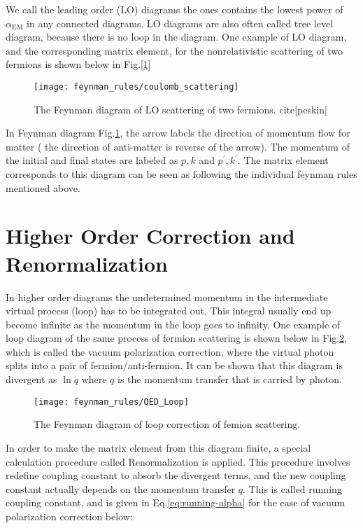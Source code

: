 We call the leading order (LO) diagrams the ones contains the lowest power of $\alpha_{\mathrm{EM}}$ in any connected diagrams. LO diagrams are also often called tree level diagram, because there is no loop in the diagram. One example of LO diagram, and the corresponding matrix element, for the nonrelativistic scattering of two fermions is shown below in Fig.[\ref{fig:QED_scattering}]
	
 \begin{figure}[hbt]
	\begin{center}
		\texttt{[image: feynman\_rules/coulomb\_scattering]}
		\caption{\small The Feynman diagram of LO scattering of two fermions. cite[peskin]}
		\label{fig:QED_scattering}
	\end{center}
\end{figure}	
	
In Feynman diagram Fig.\ref{fig:QED_scattering}, the arrow labels the direction of momentum flow for matter ( the direction of anti-matter is reverse of the arrow). The momentum of the initial and final states are labeled as $p,k$ and $p^\prime,k^\prime$. The matrix element corresponds to this diagram can be seen as following the individual feynman rules mentioned above.

\section{Higher Order Correction and Renormalization}

In higher order diagrams the undetermined momentum in the intermediate virtual process (loop) has to be integrated out. This integral usually end up become infinite as the momentum in the loop goes to infinity. One example of loop diagram of the same process of fermion scattering is shown below in Fig.\ref{fig:QED_loop}, which is called the vacuum polarization correction, where the virtual photon splits into a pair of fermion/anti-fermion. It can be shown that this diagram is divergent as $\ln q$ where $q$ is the momentum transfer that is carried by photon. 

 \begin{figure}[hbt]
	\begin{center}
		\texttt{[image: feynman\_rules/QED\_Loop]}
		\caption{\small The Feynman diagram of loop correction of femion scattering.}
		\label{fig:QED_loop}
	\end{center}
\end{figure}

In order to make the matrix element from this diagram finite, a special calculation procedure called Renormalization is applied. This procedure involves redefine coupling constant to absorb the divergent terms, and the new coupling constant actually depends on the momentum transfer $q$. This is called running coupling constant, and is given in Eq.\ref{eq:running-alpha} for the case of vacuum polarization correction below:


